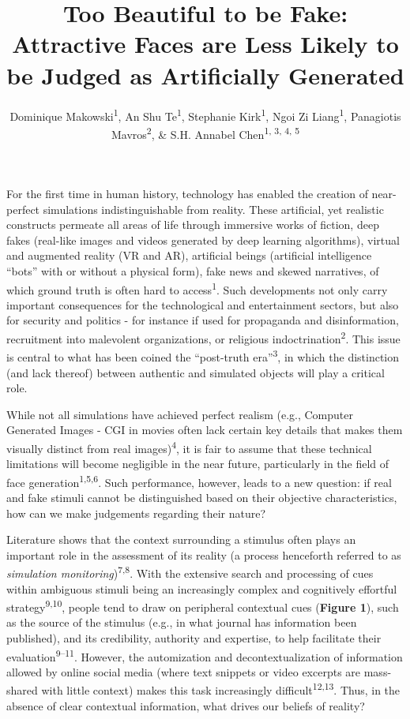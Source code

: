 \documentclass[
  man,floatsintext]{apa6}
\title{\textbf{Too Beautiful to be Fake: Attractive Faces are Less Likely to be Judged as Artificially Generated}}
\author{Dominique Makowski\textsuperscript{1}, An Shu Te\textsuperscript{1}, Stephanie Kirk\textsuperscript{1}, Ngoi Zi Liang\textsuperscript{1}, Panagiotis Mavros\textsuperscript{2}, \& S.H. Annabel Chen\textsuperscript{1, 3, 4, 5}}
\date{}
\affiliation{\vspace{0.5cm}\textsuperscript{1} School of Social Sciences, Nanyang Technological University, Singapore\\\textsuperscript{2} Singapore-ETH Centre, Future Cities Laboratory, Singapore\\\textsuperscript{3} LKC Medicine, Nanyang Technological University, Singapore\\\textsuperscript{4} National Institute of Education, Singapore\\\textsuperscript{5} Centre for Research and Development in Learning, Nanyang Technological University, Singapore}
\begin{document}
\maketitle

For the first time in human history, technology has enabled the creation of near-perfect simulations indistinguishable from reality. These artificial, yet realistic constructs permeate all areas of life through immersive works of fiction, deep fakes (real-like images and videos generated by deep learning algorithms), virtual and augmented reality (VR and AR), artificial beings (artificial intelligence ``bots'' with or without a physical form), fake news and skewed narratives, of which ground truth is often hard to access\textsuperscript{1}. Such developments not only carry important consequences for the technological and entertainment sectors, but also for security and politics - for instance if used for propaganda and disinformation, recruitment into malevolent organizations, or religious indoctrination\textsuperscript{2}. This issue is central to what has been coined the ``post-truth era''\textsuperscript{3}, in which the distinction (and lack thereof) between authentic and simulated objects will play a critical role.

While not all simulations have achieved perfect realism (e.g., Computer Generated Images - CGI in movies often lack certain key details that makes them visually distinct from real images)\textsuperscript{4}, it is fair to assume that these technical limitations will become negligible in the near future, particularly in the field of face generation\textsuperscript{1,5,6}. Such performance, however, leads to a new question: if real and fake stimuli cannot be distinguished based on their objective characteristics, how can we make judgements regarding their nature?

Literature shows that the context surrounding a stimulus often plays an important role in the assessment of its reality (a process henceforth referred to as \emph{simulation monitoring})\textsuperscript{7,8}. With the extensive search and processing of cues within ambiguous stimuli being an increasingly complex and cognitively effortful strategy\textsuperscript{9,10}, people tend to draw on peripheral contextual cues (\textbf{Figure 1}), such as the source of the stimulus (e.g., in what journal has information been published), and its credibility, authority and expertise, to help facilitate their evaluation\textsuperscript{9--11}. However, the automization and decontextualization of information allowed by online social media (where text snippets or video excerpts are mass-shared with little context) makes this task increasingly difficult\textsuperscript{12,13}. Thus, in the absence of clear contextual information, what drives our beliefs of reality?
\end{document}
